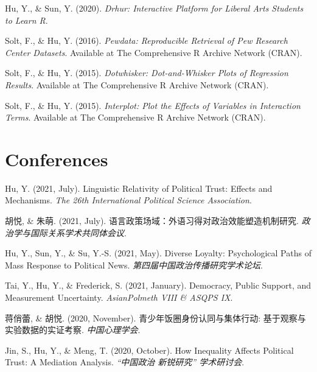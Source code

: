 \documentclass[11pt, a4paper]{awesome-cv}
\begin{document}
\leavevmode\hypertarget{ref-HuSun2020}{}%
Hu, Y., \& Sun, Y. (2020). \emph{Drhur: {Interactive Platform} for
{Liberal Arts Students} to {Learn R}}.

\leavevmode\hypertarget{ref-SoltHu2016}{}%
Solt, F., \& Hu, Y. (2016). \emph{Pewdata: {Reproducible Retrieval} of
{Pew Research Center Datasets}}. Available at The Comprehensive R
Archive Network (CRAN).

\leavevmode\hypertarget{ref-SoltHu2015}{}%
Solt, F., \& Hu, Y. (2015). \emph{Dotwhisker: {Dot}-and-{Whisker Plots}
of {Regression Results}}. Available at The Comprehensive R Archive
Network (CRAN).

\leavevmode\hypertarget{ref-SoltHu2015a}{}%
Solt, F., \& Hu, Y. (2015). \emph{Interplot: {Plot} the {Effects} of
{Variables} in {Interaction Terms}}. Available at The Comprehensive R
Archive Network (CRAN).

\endgroup

\hypertarget{conferences}{%
\section{Conferences}\label{conferences}}

\begingroup
\setlength{\parindent}{-0.5in}
\setlength{\leftskip}{0.5in}

\hypertarget{refs_conference}{}
\leavevmode\hypertarget{ref-Hu2021a}{}%
Hu, Y. (2021, July). Linguistic {Relativity} of {Political Trust}:
{Effects} and {Mechanisms}. \emph{The 26th {International Political
Science Association}}.

\leavevmode\hypertarget{ref-HuYueZhuMeng2021}{}%
胡悦, \& 朱萌. (2021, July).
语言政策场域：外语习得对政治效能塑造机制研究.
\emph{政治学与国际关系学术共同体会议}.

\leavevmode\hypertarget{ref-HuEtAl2021a}{}%
Hu, Y., Sun, Y., \& Su, Y.-S. (2021, May). Diverse {Loyalty}:
{Psychological Paths} of {Mass Response} to {Political News}.
\emph{第四届中国政治传播研究学术论坛}.

\leavevmode\hypertarget{ref-TaiEtAl2021}{}%
Tai, Y., Hu, Y., \& Frederick, S. (2021, January). Democracy, {Public
Support}, and {Measurement Uncertainty}. \emph{{AsianPolmeth VIII} \&
{ASQPS IX}}.

\leavevmode\hypertarget{ref-JiangQiaoLeiHuYue2020}{}%
蒋俏蕾, \& 胡悦. (2020, November). 青少年饭圈身份认同与集体行动:
基于观察与实验数据的实证考察. \emph{中国心理学会}.

\leavevmode\hypertarget{ref-JinEtAl2020}{}%
Jin, S., Hu, Y., \& Meng, T. (2020, October). How {Inequality Affects
Political Trust}: {A Mediation Analysis}. \emph{{``中国政治 新锐研究''}
学术研讨会}.
\end{document}
